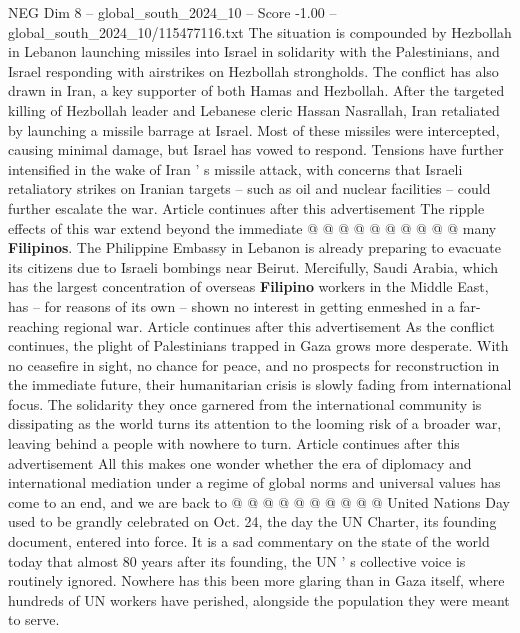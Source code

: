 \begin{textsample}{NEG Dim 8 – global\_south\_2024\_10 – Score -1.00 – global\_south\_2024\_10/115477116.txt}
The situation is compounded by Hezbollah in Lebanon launching missiles into Israel in solidarity with the Palestinians, and Israel responding with airstrikes on Hezbollah strongholds.
The conflict has also drawn in Iran, a key supporter of both Hamas and Hezbollah.
After the targeted killing of Hezbollah leader and Lebanese cleric Hassan Nasrallah, Iran retaliated by launching a missile barrage at Israel.
Most of these missiles were intercepted, causing minimal damage, but Israel has vowed to respond.
Tensions have further intensified in the wake of Iran ' s missile attack, with concerns that Israeli retaliatory strikes on Iranian targets -- such as oil and nuclear facilities -- could further escalate the war.
Article continues after this advertisement The ripple effects of this war extend beyond the immediate @ @ @ @ @ @ @ @ @ @ many \textbf{Filipinos}.
The Philippine Embassy in Lebanon is already preparing to evacuate its citizens due to Israeli bombings near Beirut.
Mercifully, Saudi Arabia, which has the largest concentration of overseas \textbf{Filipino} workers in the Middle East, has -- for reasons of its own -- shown no interest in getting enmeshed in a far-reaching regional war.
Article continues after this advertisement As the conflict continues, the plight of Palestinians trapped in Gaza grows more desperate.
With no ceasefire in sight, no chance for peace, and no prospects for reconstruction in the immediate future, their humanitarian crisis is slowly fading from international focus.
The solidarity they once garnered from the international community is dissipating as the world turns its attention to the looming risk of a broader war, leaving behind a people with nowhere to turn.
Article continues after this advertisement All this makes one wonder whether the era of diplomacy and international mediation under a regime of global norms and universal values has come to an end, and we are back to @ @ @ @ @ @ @ @ @ @ United Nations Day used to be grandly celebrated on Oct. 24, the day the UN Charter, its founding document, entered into force.
It is a sad commentary on the state of the world today that almost 80 years after its founding, the UN ' s collective voice is routinely ignored.
Nowhere has this been more glaring than in Gaza itself, where hundreds of UN workers have perished, alongside the population they were meant to serve.

\end{textsample}
